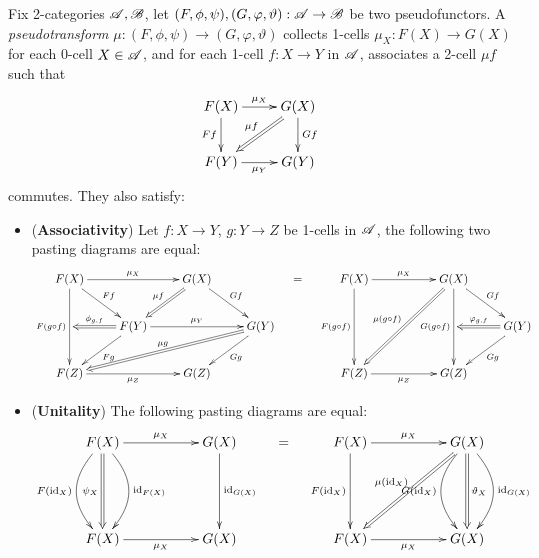 \documentclass{article}
\begin{document}
\hfil

\begin{defn}[Pseudotransform]\label{defn_pseudotransform}
    Fix 2-categories $\mathscr{A},\mathscr{B}$, let $(F,\phi,\psi), (G,\varphi,\vartheta):\mathscr{A}\rightarrow\mathscr{B}$ be two pseudofunctors. A \emph{pseudotransform} $\mu:(F,\phi,\psi)\rightarrow (G,\varphi,\vartheta)$ collects 1-cells $\mu_X:F(X)\rightarrow G(X)$ for each 0-cell $X\in\mathscr{A}$, and for each 1-cell $f:X\rightarrow Y$ in $\mathscr{A}$, associates a 2-cell $\mu f$ such that 
    \begin{align*}
        \xymatrix{
            F(X) \ar[r]^-{\mu_X} \ar[d]_-{Ff} & G(X) \ar[d]^-{Gf} \ar@{=>}[dl]_-{\mu f}\\
            F(Y) \ar[r]_-{\mu_Y} & G(Y)
        }
    \end{align*}
    commutes. They also satisfy:
    \begin{itemize}
        \item[(i)] (\textbf{Associativity}) Let $f:X\rightarrow Y$, $g:Y\rightarrow Z$ be 1-cells in $\mathscr{A}$, the following two pasting diagrams are equal:
        \begin{align*}
            \xymatrix{
                F(X) \ar[dd]_-{F(g\circ f)} \ar[dr]^-{Ff} \ar[rr]^-{\mu_X} && G(X) \ar@{=>}[dl]_-{\mu f} \ar[dr]^-{Gf}\\
                & F(Y) \ar[rr]^-{\mu_Y} \ar@{=>}[l]_-{\phi_{g,f}} \ar[dl]^-{Fg} && G(Y) \ar[dl]^-{Gg} \ar@{=>}[dlll]_-{\mu g}\\
                F(Z) \ar[rr]_-{\mu_Z} && G(Z)
            } \quad = \quad \xymatrix{
                F(X) \ar[dd]_-{F(g\circ f)} \ar[rr]^-{\mu_X} && G(X) \ar[dr]^-{Gf} \ar[dd]_-{G(g\circ f)} \ar@{=>}[ddll]_-{\mu(g\circ f)}\\
                &&& G(Y) \ar[dl]^-{Gg} \ar@{=>}[l]_-{\varphi_{g,f}}\\
                F(Z) \ar[rr]_-{\mu_Z} && G(Z)
            }
        \end{align*}
        \item[(ii)] (\textbf{Unitality}) The following pasting diagrams are equal:
        \begin{align*}
            \xymatrix{
                F(X) \ar@(dl,ul)[dd]_-{F(\id_X)} \ar@(dr,ur)[dd]^-{\id_{F(X)}} \ar@{=>}[dd]_-{\psi_X} \ar[rr]^-{\mu_X} && G(X) \ar[dd]^-{\id_{G(X)}}\\
                \\
                F(X) \ar[rr]_-{\mu_X} && G(X)
            }\quad = \quad \xymatrix{
                F(X) \ar[dd]_-{F(\id_X)} \ar[rr]^-{\mu_X} && G(X) \ar@{=>}[ddll]_-{\mu(\id_X)} \ar@(dl,ul)[dd]_-{G(\id_X)} \ar@(dr,ur)[dd]^-{\id_{G(X)}} \ar@{=>}[dd]^-{\vartheta_X}\\
                \\
                F(X) \ar[rr]_-{\mu_X} && G(X)
            }
        \end{align*}
    \end{itemize}
\end{defn}
\end{document}

